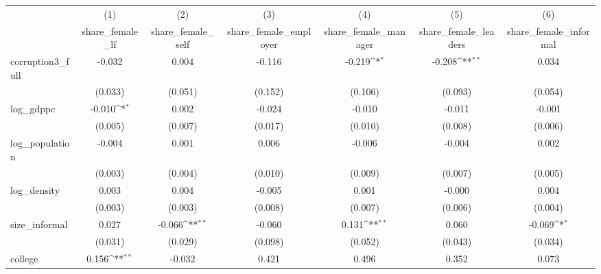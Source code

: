 {
\def\sym#1{\ifmmode^{#1}\else\(^{#1}\)\fi}
\begin{tabular}{l*{6}{c}}
\hline\hline
            &\multicolumn{1}{c}{(1)}&\multicolumn{1}{c}{(2)}&\multicolumn{1}{c}{(3)}&\multicolumn{1}{c}{(4)}&\multicolumn{1}{c}{(5)}&\multicolumn{1}{c}{(6)}\\
            &\multicolumn{1}{c}{share\_female\_lf}&\multicolumn{1}{c}{share\_female\_self}&\multicolumn{1}{c}{share\_female\_employer}&\multicolumn{1}{c}{share\_female\_manager}&\multicolumn{1}{c}{share\_female\_leaders}&\multicolumn{1}{c}{share\_female\_informal}\\
\hline
corruption3\_full&      -0.032         &       0.004         &      -0.116         &      -0.219\sym{*}  &      -0.208\sym{**} &       0.034         \\
            &     (0.033)         &     (0.051)         &     (0.152)         &     (0.106)         &     (0.093)         &     (0.054)         \\
[1em]
log\_gdppc   &      -0.010\sym{*}  &       0.002         &      -0.024         &      -0.010         &      -0.011         &      -0.001         \\
            &     (0.005)         &     (0.007)         &     (0.017)         &     (0.010)         &     (0.008)         &     (0.006)         \\
[1em]
log\_population&      -0.004         &       0.001         &       0.006         &      -0.006         &      -0.004         &       0.002         \\
            &     (0.003)         &     (0.004)         &     (0.010)         &     (0.009)         &     (0.007)         &     (0.005)         \\
[1em]
log\_density &       0.003         &       0.004         &      -0.005         &       0.001         &      -0.000         &       0.004         \\
            &     (0.003)         &     (0.003)         &     (0.008)         &     (0.007)         &     (0.006)         &     (0.004)         \\
[1em]
size\_informal&       0.027         &      -0.066\sym{**} &      -0.060         &       0.131\sym{**} &       0.060         &      -0.069\sym{*}  \\
            &     (0.031)         &     (0.029)         &     (0.098)         &     (0.052)         &     (0.043)         &     (0.034)         \\
[1em]
college     &       0.156\sym{**} &      -0.032         &       0.421         &       0.496         &       0.352         &       0.073         \\

\end{tabular}}
